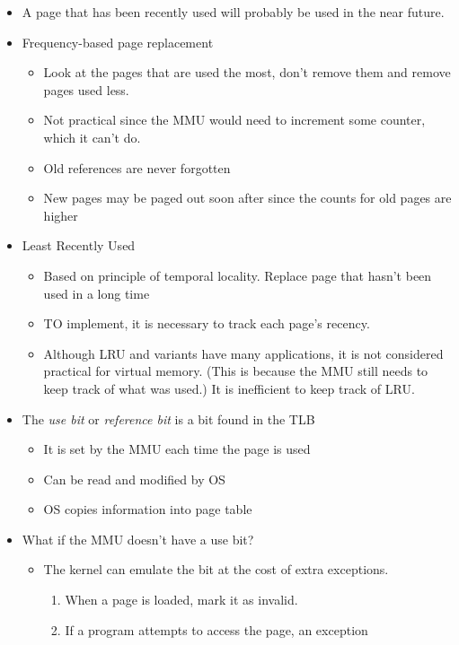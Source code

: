 \documentclass[12pt]{article}
\begin{document}
\begin{itemize}
	\item A page that has been recently used will probably be used in the near
		future.

	\item Frequency-based page replacement
		\begin{itemize}
			\item Look at the pages that are used the most, don't remove them
				and remove pages used less.
			\item Not practical since the MMU would need to increment some
				counter, which it can't do.
			\item Old references are never forgotten
			\item New pages may be paged out soon after since the counts for old
				pages are higher
		\end{itemize}
	\item Least Recently Used
		\begin{itemize}
			\item Based on principle of temporal locality. Replace page that
				hasn't been used in a long time
			\item TO implement, it is necessary to track each page's recency.
			\item Although LRU and variants have many applications, it is not
				considered practical for virtual memory. (This is because the
				MMU still needs to keep track of what was used.) It is
				inefficient to keep track of LRU.
		\end{itemize}
	\item The \emph{use bit} or \emph{reference bit} is a bit found in the TLB
		\begin{itemize}
			\item It is set by the MMU each time the page is used
			\item Can be read and modified by OS
			\item OS copies information into page table
		\end{itemize}
	\item What if the MMU doesn't have a use bit?
		\begin{itemize}
			\item The kernel can emulate the bit at the cost of extra
				exceptions.
				\begin{enumerate}
					\item When a page is loaded, mark it as invalid.
					\item If a program attempts to access the page, an exception

\end{enumerate}
\end{itemize}
\end{itemize}
\end{document}
